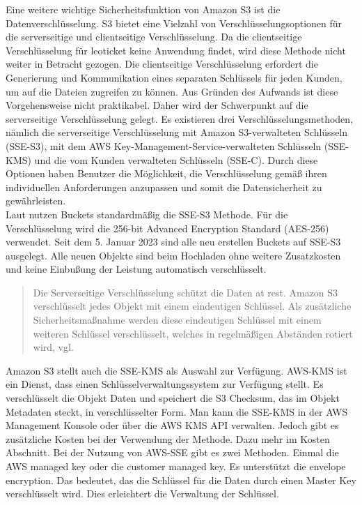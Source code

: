 Eine weitere wichtige Sicherheitsfunktion von Amazon S3 ist die Datenverschlüsselung. S3 bietet eine Vielzahl von Verschlüsselungsoptionen für die serverseitige und clientseitige Verschlüsselung. Da die clientseitige Verschlüsselung für leoticket keine Anwendung findet, wird diese Methode nicht weiter in Betracht gezogen. Die clientseitige Verschlüsselung erfordert die Generierung und Kommunikation eines separaten Schlüssels für jeden Kunden, um auf die Dateien zugreifen zu können. Aus Gründen des Aufwands ist diese Vorgehensweise nicht praktikabel. Daher wird der Schwerpunkt auf die serverseitige Verschlüsselung gelegt. Es existieren drei Verschlüsselungsmethoden, nämlich die serverseitige Verschlüsselung mit Amazon S3-verwalteten Schlüsseln (SSE-S3), mit dem AWS Key-Management-Service-verwalteten Schlüsseln (SSE-KMS) und die vom Kunden verwalteten Schlüsseln (SSE-C). Durch diese Optionen haben Benutzer die Möglichkeit, die Verschlüsselung gemäß ihren individuellen Anforderungen anzupassen und somit die Datensicherheit zu gewährleisten.\\


Laut \citeauthor{aws-iam-s3} nutzen Buckets standardmäßig die SSE-S3 Methode. Für die Verschlüsselung wird die 256-bit Advanced Encryption Standard (AES-256) verwendet. Seit dem 5. Januar 2023 sind alle neu erstellen Buckets auf SSE-S3 ausgelegt. Alle neuen Objekte sind beim Hochladen ohne weitere Zusatzkosten und keine Einbußung der Leistung automatisch verschlüsselt.

\begin{quote}
	Die Serverseitige Verschlüsselung schützt die Daten at rest. Amazon S3 verschlüsselt jedes Objekt mit einem eindeutigen Schlüssel. Als zusätzliche Sicherheitsmaßnahme werden diese eindeutigen Schlüssel mit einem weiteren Schlüssel verschlüsselt, welches in regelmäßigen Abständen rotiert wird, vgl. \cite{aws-iam-s3}
\end{quote}

Amazon S3 stellt auch die SSE-KMS als Auswahl zur Verfügung. AWS-KMS ist ein Dienst, dass einen Schlüsselverwaltungssystem zur Verfügung stellt. Es verschlüsselt die Objekt Daten und speichert die S3 Checksum, das im Objekt Metadaten steckt, in verschlüsselter Form. Man kann die SSE-KMS in der AWS Management Konsole oder über die AWS KMS API verwalten. Jedoch gibt es zusätzliche Kosten bei der Verwendung der Methode. Dazu mehr im Kosten Abschnitt. Bei der Nutzung von AWS-SSE gibt es zwei Methoden. Einmal die AWS managed key oder die customer managed key. Es unterstützt die \glqq envelope encryption\grqq. Das bedeutet, das die Schlüssel für die Daten durch einen Master Key verschlüsselt wird. Dies erleichtert die Verwaltung der Schlüssel.\\


